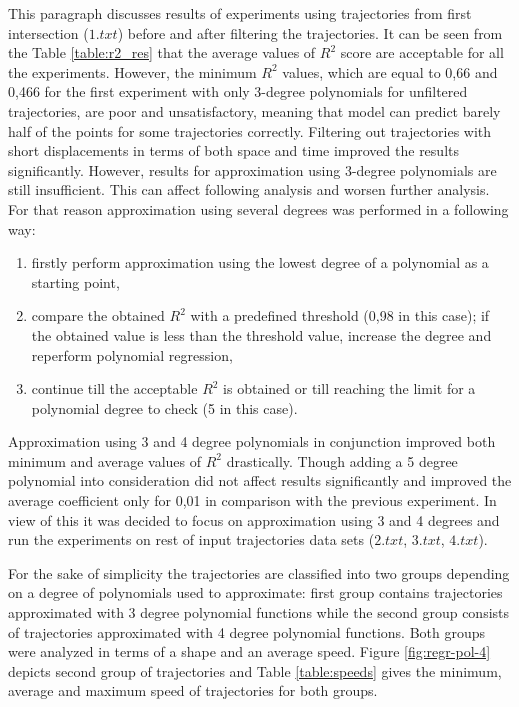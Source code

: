 This paragraph discusses results of experiments using trajectories from first intersection ($1.txt$) before and after filtering the trajectories. It can be seen from the Table \ref{table:r2_res} that the average values of $R^2$ score are acceptable for all the experiments. However, the minimum $R^2$ values, which are equal to 0,66 and 0,466 for the first experiment with only 3-degree polynomials for unfiltered trajectories, are poor and unsatisfactory, meaning that model can predict barely half of the points for some trajectories correctly. Filtering out trajectories with short displacements in terms of both space and time improved the results significantly. However, results for approximation using 3-degree polynomials are still insufficient. This can affect following analysis and worsen further analysis. For that reason approximation using several degrees was performed in a following way:

\begin{enumerate}
	\setlength\itemsep{0em}
	\item firstly perform approximation using the lowest degree of a polynomial as a starting point,
	\item compare the obtained $R^2$ with a predefined threshold (0,98 in this case); if the obtained value is less than the threshold value, increase the degree and reperform polynomial regression,
	\item continue till the acceptable $R^2$ is obtained or till reaching the limit for a polynomial degree to check (5 in this case). 
\end{enumerate} 

Approximation using 3 and 4 degree polynomials in conjunction improved both minimum and average values of $R^2$ drastically. Though adding a 5 degree polynomial into consideration did not affect results significantly and improved the average coefficient only for 0,01 in comparison with the previous experiment. In view of this it was decided to focus on approximation using 3 and 4 degrees and run the experiments on rest of input trajectories data sets ($2.txt$, $3.txt$, $4.txt$).

For the sake of simplicity the trajectories are classified into two groups depending on a degree of polynomials used to approximate: first group contains trajectories approximated with 3 degree polynomial functions while the second group consists of trajectories approximated with 4 degree polynomial functions. Both groups were analyzed in terms of a shape and an average speed. Figure \ref{fig:regr-pol-4} depicts second group of trajectories and Table \ref{table:speeds} gives the minimum, average and maximum speed of trajectories for both groups.

